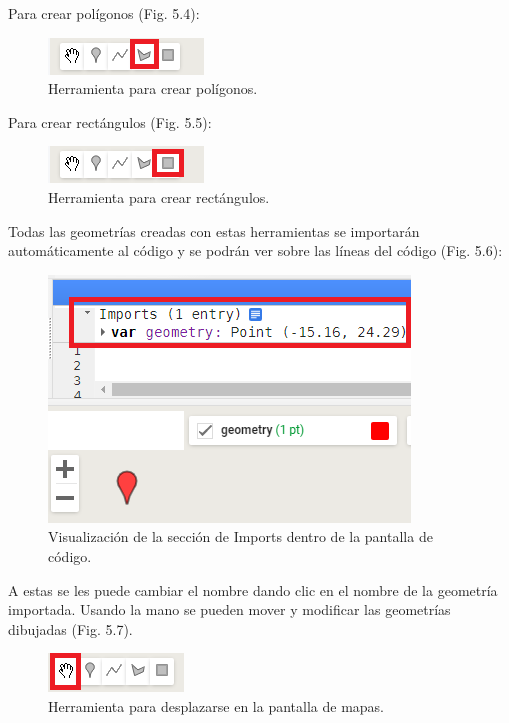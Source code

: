 \documentclass[
  12pt,
  letterpaper,
  twoside]{book}
\begin{document}
Para crear polígonos (Fig. 5.4):

\begin{figure}[btp]

{\centering \includegraphics[width=0.2\linewidth]{Img/poligono} 

}

\caption{Herramienta para crear polígonos.}\label{fig:unnamed-chunk-59}
\end{figure}

Para crear rectángulos (Fig. 5.5):

\begin{figure}[btp]

{\centering \includegraphics[width=0.2\linewidth]{Img/rec} 

}

\caption{Herramienta para crear rectángulos.}\label{fig:unnamed-chunk-60}
\end{figure}

Todas las geometrías creadas con estas herramientas se importarán automáticamente al código y se podrán ver sobre las líneas del código (Fig. 5.6):

\begin{figure}[btp]

{\centering \includegraphics[width=0.5\linewidth]{Img/import} 

}

\caption{Visualización de la sección de Imports dentro de la pantalla de código.}\label{fig:unnamed-chunk-61}
\end{figure}

A estas se les puede cambiar el nombre dando clic en el nombre de la geometría importada.
Usando la mano se pueden mover y modificar las geometrías dibujadas (Fig. 5.7).

\begin{figure}[btp]

{\centering \includegraphics[width=0.2\linewidth]{Img/mano} 

}

\caption{Herramienta para desplazarse en la pantalla de mapas.}\label{fig:unnamed-chunk-62}
\end{figure}
\end{document}
